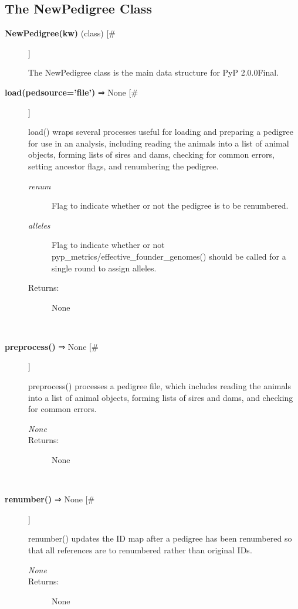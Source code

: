 \documentclass[10pt]{article}
\begin{document}
\subsection*{The NewPedigree Class}
\begin{description}
\item[\textbf{NewPedigree(kw)}
 (class) [\#]]

 The NewPedigree class is the main data structure for PyP 2.0.0Final.

\item[\textbf{load(pedsource='file')}
 ⇒ None [\#]]

 load() wraps several processes useful for loading and preparing a pedigree for use in an analysis, including reading the animals into a list of animal objects, forming lists of sires and dams, checking for common errors, setting ancestor flags, and renumbering the pedigree.
\begin{description}
\item[\emph{renum}
] Flag to indicate whether or not the pedigree is to be renumbered.
\item[\emph{alleles}
] Flag to indicate whether or not pyp\_metrics/effective\_founder\_genomes() should be called for a single round to assign alleles.
\item[Returns:] None

\end{description}
\\ 

\item[\textbf{preprocess()}
 ⇒ None [\#]]

 preprocess() processes a pedigree file, which includes reading the animals into a list of animal objects, forming lists of sires and dams, and checking for common errors.
\begin{description}
\item[\emph{None}
]
\item[Returns:] None

\end{description}
\\ 

\item[\textbf{renumber()}
 ⇒ None [\#]]

 renumber() updates the ID map after a pedigree has been renumbered so that all references are to renumbered rather than original IDs.
\begin{description}
\item[\emph{None}
]
\item[Returns:] None


\end{description}
\end{description}
\end{document}

